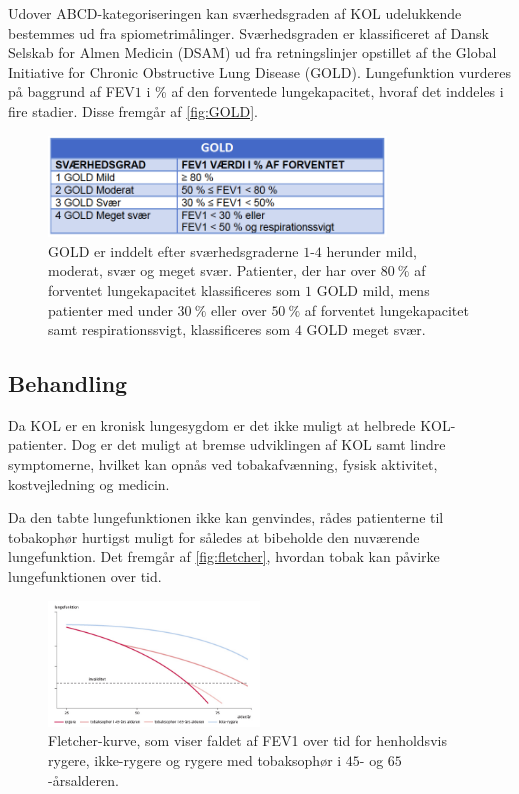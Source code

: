 \noindent
Udover ABCD-kategoriseringen kan sværhedsgraden af KOL udelukkende bestemmes ud fra spiometrimålinger. Sværhedsgraden er klassificeret af Dansk Selskab for Almen Medicin (DSAM) ud fra retningslinjer opstillet af the Global Initiative for Chronic Obstructive Lung Disease (GOLD). Lungefunktion vurderes på baggrund af FEV$1$ i \% af den forventede lungekapacitet, hvoraf det inddeles i fire stadier. Disse fremgår af \autoref{fig:GOLD}.

\begin{figure} [H]
\centering
\includegraphics[width=0.8\textwidth]{figures/GOLD}
\caption{GOLD er inddelt efter sværhedsgraderne $1$-$4$ herunder mild, moderat, svær og meget svær. Patienter, der har over $80~\%$ af forventet lungekapacitet klassificeres som $1$ GOLD mild, mens patienter med under $30~\%$ eller over $50~\%$ af forventet lungekapacitet samt respirationssvigt, klassificeres som $4$ GOLD meget svær.}
\label{fig:GOLD}
\end{figure} 

\subsection{Behandling} \label{sec:behandling}
Da KOL er en kronisk lungesygdom er det ikke muligt at helbrede KOL-patienter. Dog er det muligt at bremse udviklingen af KOL samt lindre symptomerne, hvilket kan opnås ved tobakafvænning, fysisk aktivitet, kostvejledning og medicin. 

Da den tabte lungefunktionen ikke kan genvindes, rådes patienterne til tobakophør hurtigst muligt for således at bibeholde den nuværende lungefunktion. Det fremgår af \autoref{fig:fletcher}, hvordan tobak kan påvirke lungefunktionen over tid. 

\begin{figure} [H]
\centering
\includegraphics[width=0.5\textwidth]{figures/fletcher}
\caption{Fletcher-kurve, som viser faldet af FEV1 over tid for henholdsvis rygere, ikke-rygere og rygere med tobaksophør i $45$- og $65$-årsalderen.\cite{dsam2016}}
\label{fig:fletcher}
\end{figure} 

